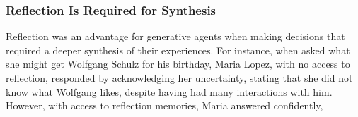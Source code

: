 \subsubsection{Reflection Is Required for Synthesis}
Reflection was an advantage for generative agents when making decisions that required a deeper synthesis of their experiences. For instance, when asked what she might get Wolfgang Schulz for his birthday, Maria Lopez, with no access to reflection, responded by acknowledging her uncertainty, stating that she did not know what Wolfgang likes, despite having had many interactions with him. However, with access to reflection memories, Maria answered confidently,  

